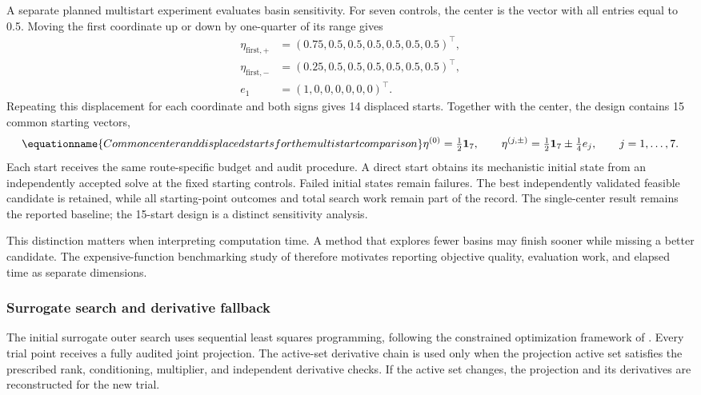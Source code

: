A separate planned multistart experiment evaluates basin sensitivity. For seven controls, the center is the vector with all entries equal to 0.5. Moving the first coordinate up or down by one-quarter of its range gives
\[
\begin{aligned}
\eta_{\mathrm{first},+}&=(0.75,0.5,0.5,0.5,0.5,0.5,0.5)^\top,\\
\eta_{\mathrm{first},-}&=(0.25,0.5,0.5,0.5,0.5,0.5,0.5)^\top,\\
e_1&=(1,0,0,0,0,0,0)^\top.
\end{aligned}
\]
Repeating this displacement for each coordinate and both signs gives 14 displaced starts. Together with the center, the design contains 15 common starting vectors,
\begin{equation}
\equationname{Common center and displaced starts for the multistart comparison}
\eta^{(0)}=\tfrac12\mathbf1_7,\qquad
\eta^{(j,\pm)}=\tfrac12\mathbf1_7\pm\tfrac14e_j,
\qquad j=1,\ldots,7.
\label{eq:plant_multistart_design}
\end{equation}
Each start receives the same route-specific budget and audit procedure. A direct start obtains its mechanistic initial state from an independently accepted solve at the fixed starting controls. Failed initial states remain failures. The best independently validated feasible candidate is retained, while all starting-point outcomes and total search work remain part of the record. The single-center result remains the reported baseline; the 15-start design is a distinct sensitivity analysis.

This distinction matters when interpreting computation time. A method that explores fewer basins may finish sooner while missing a better candidate. The expensive-function benchmarking study of \citet{Bliek2023} therefore motivates reporting objective quality, evaluation work, and elapsed time as separate dimensions.

\subsubsection{Surrogate search and derivative fallback}

The initial surrogate outer search uses sequential least squares programming, following the constrained optimization framework of \citet{Kraft1988}. Every trial point receives a fully audited joint projection. The active-set derivative chain is used only when the projection active set satisfies the prescribed rank, conditioning, multiplier, and independent derivative checks. If the active set changes, the projection and its derivatives are reconstructed for the new trial.

